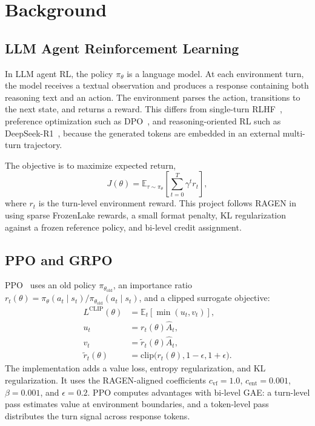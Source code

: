 \section{Background}
\label{sec:background}

\subsection{LLM Agent Reinforcement Learning}

In LLM agent RL, the policy \(\pi_\theta\) is a language model. At each environment turn, the model receives a textual observation and produces a response containing both reasoning text and an action. The environment parses the action, transitions to the next state, and returns a reward. This differs from single-turn RLHF~\citep{ouyang2022training}, preference optimization such as DPO~\citep{rafailov2023dpo}, and reasoning-oriented RL such as DeepSeek-R1~\citep{guo2025deepseekr1}, because the generated tokens are embedded in an external multi-turn trajectory.

The objective is to maximize expected return,
\begin{equation}
J(\theta)=\mathbb{E}_{\tau\sim\pi_\theta}
\left[\sum_{t=0}^{T}\gamma^t r_t\right],
\end{equation}
where \(r_t\) is the turn-level environment reward. This project follows RAGEN in using sparse FrozenLake rewards, a small format penalty, KL regularization against a frozen reference policy, and bi-level credit assignment.

\subsection{PPO and GRPO}

PPO~\citep{schulman2017ppo} uses an old policy \(\pi_{\theta_{\mathrm{old}}}\), an importance ratio \(r_t(\theta)=\pi_\theta(a_t\mid s_t)/\pi_{\theta_{\mathrm{old}}}(a_t\mid s_t)\), and a clipped surrogate objective:
\begin{align}
L^{\mathrm{CLIP}}(\theta)
&= \mathbb{E}_t\left[\min(u_t, v_t)\right], \\
u_t &= r_t(\theta)\hat{A}_t, \\
v_t &= \tilde{r}_t(\theta)\hat{A}_t, \\
\tilde{r}_t(\theta)
&= \mathrm{clip}\bigl(r_t(\theta),1-\epsilon,1+\epsilon\bigr).
\end{align}
The implementation adds a value loss, entropy regularization, and KL regularization. It uses the RAGEN-aligned coefficients \(c_{\mathrm{vf}}=1.0\), \(c_{\mathrm{ent}}=0.001\), \(\beta=0.001\), and \(\epsilon=0.2\). PPO computes advantages with bi-level GAE: a turn-level pass estimates value at environment boundaries, and a token-level pass distributes the turn signal across response tokens.

